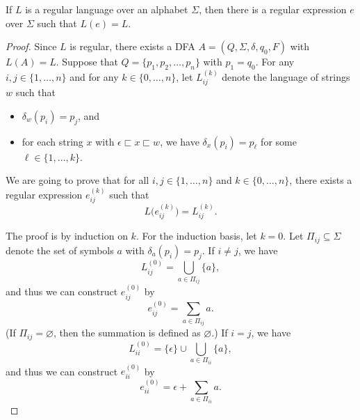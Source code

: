 \begin{lemma}
  If $L$ is a regular language over an alphabet $\Sigma$, then there is a
  regular expression $e$ over $\Sigma$ such that $L(e) = L$.
\end{lemma}
\begin{proof}
  Since $L$ is regular, there exists a DFA $A = (Q, \Sigma, \delta, q_0, F)$
  with $L(A) = L$.
  Suppose that $Q = \{p_1, p_2, \dots, p_n\}$ with $p_1 = q_0$.
  For any $i, j \in \{1, \dots, n\}$ and for any $k \in \{0, \dots, n\}$,
  let $L_{ij}^{(k)}$ denote the language of strings $w$ such that 
  \begin{itemize}
    \item $\delta_w(p_i) = p_j$, and
    \item for each string $x$ with $\epsilon \sqsubset x \sqsubset w$, we have
    $\delta_x(p_i) = p_\ell$ for some $\ell \in \{1, \dots, k\}$.
  \end{itemize}
  We are going to prove that for all $i, j \in \{1, \dots, n\}$ and
  $k \in \{0, \dots, n\}$, there exists a regular expression $e_{ij}^{(k)}$
  such that
  \begin{equation*}
    L\bigl(e_{ij}^{(k)}\bigr) = L_{ij}^{(k)}.
  \end{equation*}

  The proof is by induction on $k$. For the induction basis, let $k = 0$.
  Let $\Pi_{ij} \subseteq \Sigma$ denote the set of symbols $a$ with
  $\delta_a(p_i) = p_j$.
  If $i \neq j$, we have
  \begin{equation*}
    L_{ij}^{(0)} = \bigcup_{a \in \Pi_{ij}} \{a\},
  \end{equation*}
  and thus we can construct $e_{ij}^{(0)}$ by
  \begin{equation*}
    e_{ij}^{(0)} = \sum_{a \in \Pi_{ij}} a.
  \end{equation*}
  (If $\Pi_{ij} = \varnothing$, then the summation is defined as
  $\varnothing$.)
  If $i = j$, we have
  \begin{equation*}
    L_{ii}^{(0)} = \{\epsilon\} \cup \bigcup_{a \in \Pi_{ii}} \{a\},
  \end{equation*}
  and thus we can construct $e_{ii}^{(0)}$ by
  \begin{equation*}
    e_{ii}^{(0)} = \epsilon + \sum_{a \in \Pi_{ii}} a.
  \end{equation*}


\end{proof}
